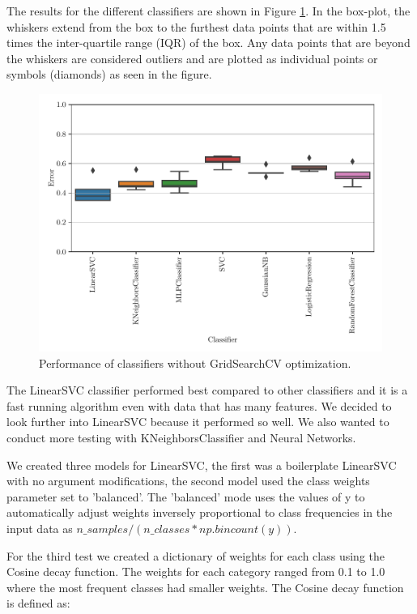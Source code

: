 The results for the different classifiers are shown in Figure \ref{fig:explore_classifiers}. In the box-plot, the whiskers extend from the box to the furthest data points that are within 1.5 times the inter-quartile range (IQR) of the box. Any data points that are beyond the whiskers are considered outliers and are plotted as individual points or symbols (diamonds) as seen in the figure.


\begin{figure}[ht]
  \centering
  \includegraphics[width=\scale\textwidth]{../img/plot_explore_classifiers.pdf}
  \caption{Performance of classifiers without GridSearchCV optimization.}
  \label{fig:explore_classifiers}
\end{figure} 

The LinearSVC classifier performed best compared to other classifiers and it is a fast running algorithm even with data that has many features. We decided to look further into LinearSVC because it performed so well. We also wanted to conduct more testing with KNeighborsClassifier and Neural Networks. 

We created three models for LinearSVC, the first was a boilerplate LinearSVC with no argument modifications, the second model used the class weights parameter set to 'balanced'. The 'balanced' mode uses the values of y to automatically adjust weights inversely proportional to class frequencies in the input data as $n\_samples / (n\_classes * np.bincount(y))$. 

For the third test we created a dictionary of weights for each class using the Cosine decay function. The weights for each category ranged from 0.1 to 1.0 where the most frequent classes had smaller weights. The Cosine decay function is defined as:

